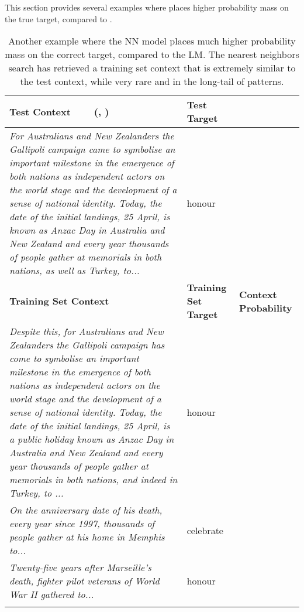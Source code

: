 \documentclass{article} \usepackage{iclr2020_conference,times}
\begin{document}
This section provides several examples where  places higher probability mass on the true target, compared to .



\begin{table}[h]
\centering
\small
\begin{tabular}{p{9.5cm}>{\centering\arraybackslash}m{1.6cm}>{\centering\arraybackslash}m{1.6cm}}
        \toprule[1.5pt]
\textbf{Test Context} ~~~ (, )         & \textbf{Test Target}        &                     \\ \midrule[0.75pt]
\emph{For Australians and New Zealanders the Gallipoli campaign came to symbolise an important milestone in the emergence of both nations as independent actors on the world stage and the development of a sense of national identity. Today, the date of the initial landings, 25 April, is known as Anzac Day in Australia and New Zealand and every year thousands of people gather at memorials in both nations, as well as Turkey, to...}                    & honour                    \\\addlinespace[0.15em]
                     \midrule[0.75pt]
\textbf{Training Set Context} & \textbf{Training Set Target} & \textbf{Context Probability} \\ 
                     \midrule[0.75pt]
\emph{Despite this, for Australians and New Zealanders the Gallipoli campaign has come to symbolise an important milestone in the emergence of both nations as independent actors on the world stage and the development of a sense of national identity. Today, the date of the initial landings, 25 April, is a public holiday known as Anzac Day in Australia and New Zealand and every year thousands of people gather at memorials in both nations, and indeed in Turkey, to ...}  &  honour        &  0.995                   \\\addlinespace[0.5em]\emph{On the anniversary date of his death, every year since 1997, thousands of people gather at his home in Memphis to...}  &  celebrate        &  0.0086                   \\\addlinespace[0.5em]\emph{Twenty-five years after Marseille's death, fighter pilot veterans of World War II gathered to...}  &  honour        &  0.0000041                   \\\addlinespace[0.5em]\bottomrule[1.5pt]
\end{tabular}
    \caption{Another example where the NN model places much higher probability mass on the correct target, compared to the LM. The nearest neighbors search has retrieved a training set context that is extremely similar to the test context, while very rare and in the long-tail of patterns.}
    \label{table:app_output}
\end{table}
\end{document}
